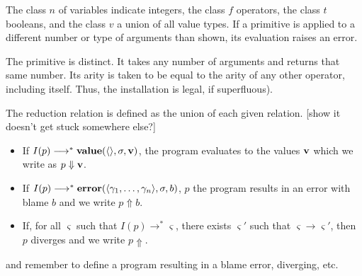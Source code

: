 The class $n$ of variables indicate integers, the class $f$ operators, the class $t$ booleans, and the class $v$ a union of all value types.
If a primitive is applied to a different number or type of arguments than shown, its evaluation raises an error.

The  primitive is distinct.
It takes any number of arguments and returns that same number.
Its arity is taken to be equal to the arity of any other operator, including itself.
Thus, the installation  is legal, if superfluous).



The reduction relation is defined as the union of each given relation.
[show it doesn't get stuck somewhere else?]
\begin{itemize}
\item If $I(p)\longrightarrow^{*}\mathbf{value}(\langle\rangle,\sigma,\mathbf{v})$, the program evaluates to the values $\mathbf{v}$ which we write as $p\Downarrow\mathbf{v}$.
\item If $I(p)\longrightarrow^{*}\mathbf{error}(\langle\gamma_1,\dots,\gamma_n\rangle,\sigma,b)$, $p$ the program results in an error with blame $b$ and we write $p\Uparrow b$.
\item If, for all $\varsigma$ such that $I(p)\longrightarrow^{*}\varsigma$, there exists $\varsigma'$ such that $\varsigma\longrightarrow\varsigma'$, then $p$ diverges and we write $p\Uparrow$.
\end{itemize}


and remember to define a program resulting in a blame error, diverging, etc.